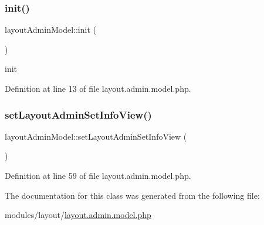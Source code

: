 \subsubsection{\texorpdfstring{init()}{init()}}
{\footnotesize\ttfamily layout\+Admin\+Model\+::init (\begin{DoxyParamCaption}{ }\end{DoxyParamCaption})}

init 

Definition at line 13 of file layout.\+admin.\+model.\+php.

\hypertarget{classlayoutAdminModel_a5d53a19d62ff5fcbd2cc604e3d6a8e29}{}\label{classlayoutAdminModel_a5d53a19d62ff5fcbd2cc604e3d6a8e29} 
\subsubsection{\texorpdfstring{set\+Layout\+Admin\+Set\+Info\+View()}{setLayoutAdminSetInfoView()}}
{\footnotesize\ttfamily layout\+Admin\+Model\+::set\+Layout\+Admin\+Set\+Info\+View (\begin{DoxyParamCaption}{ }\end{DoxyParamCaption})}



Definition at line 59 of file layout.\+admin.\+model.\+php.



The documentation for this class was generated from the following file\+:\begin{DoxyCompactItemize}
\item 
modules/layout/\hyperlink{layout_8admin_8model_8php}{layout.\+admin.\+model.\+php}\end{DoxyCompactItemize}
